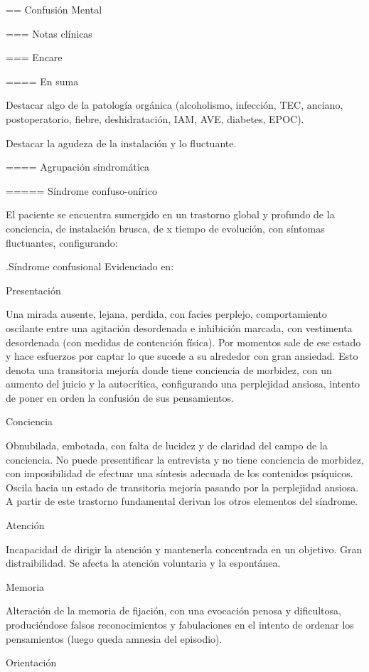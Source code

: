 \documentclass[encares.tex]{subfiles}
\begin{document}
== Confusión Mental

=== Notas clínicas

=== Encare

==== En suma

Destacar algo de la patología orgánica (alcoholismo, infección, TEC, anciano, postoperatorio, fiebre, deshidratación, IAM, AVE, diabetes, EPOC).

Destacar la agudeza de la instalación y lo fluctuante.

==== Agrupación sindromática

===== Síndrome confuso-onírico

El paciente se encuentra sumergido en un trastorno global y profundo de la conciencia, de instalación brusca, de x tiempo de evolución, con síntomas fluctuantes, configurando:

.Síndrome confusional
Evidenciado en:

Presentación

Una mirada ausente, lejana, perdida, con facies perplejo, comportamiento oscilante entre una agitación desordenada e inhibición marcada, con vestimenta desordenada (con medidas de contención física). Por momentos sale de ese estado y hace esfuerzos por captar lo que sucede a su alrededor con gran ansiedad. Esto denota una transitoria mejoría donde tiene conciencia de morbidez, con un aumento del juicio y la autocrítica, configurando una perplejidad ansiosa, intento de poner en orden la confusión de sus pensamientos.

Conciencia

Obnubilada, embotada, con falta de lucidez y de claridad del campo de la conciencia. No puede presentificar la entrevista y no tiene conciencia de morbidez, con imposibilidad de efectuar una síntesis adecuada de los contenidos psíquicos. Oscila hacia un estado de transitoria mejoría pasando por la perplejidad ansiosa. A partir de este trastorno fundamental derivan los otros elementos del síndrome.

Atención

Incapacidad de dirigir la atención y mantenerla concentrada en un objetivo. Gran distraibilidad. Se afecta la atención voluntaria y la espontánea.

Memoria

Alteración de la memoria de fijación, con una evocación penosa y dificultosa, produciéndose falsos reconocimientos y fabulaciones en el intento de ordenar los pensamientos (luego queda amnesia del episodio).

Orientación
\end{document}
